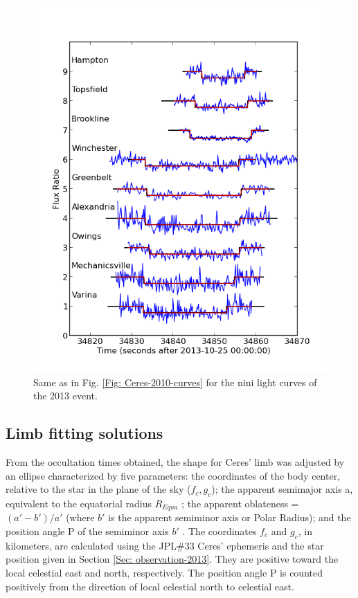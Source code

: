 \documentclass[useAMS,usenatbib]{mn2e}
\begin{document}
\begin{figure}
\includegraphics[scale=0.58]{figures/Ceres_2013_fluxratio} 
\caption{Same as in Fig. \ref{Fig: Ceres-2010-curves} for the nini light curves of the 2013 event. \label{Fig: Ceres-2013-curves}}
\end{figure}

\subsection{Limb fitting solutions}

From the occultation times obtained, the shape for Ceres' limb was adjusted by an ellipse characterized by five parameters: the coordinates of the body center, relative to the star in the plane of the sky ($f_{c}, g_{c}$); the apparent semimajor axis a, equivalent to the equatorial radius $R_{Equa}$ ; the apparent oblateness = $(a'-b')/a'$ (where $b'$ is the apparent semiminor axis or Polar Radius); and the position angle P of the semiminor axis $b'$ . The coordinates $f_{c}$ and $g_{c}$, in kilometers, are calculated using the JPL\#33  Ceres' ephemeris and the star position given in Section \ref{Sec: observation-2013}. They are positive toward the local celestial east and north, respectively.  The position angle P is counted positively from the direction of local celestial north to celestial east.
\end{document}
